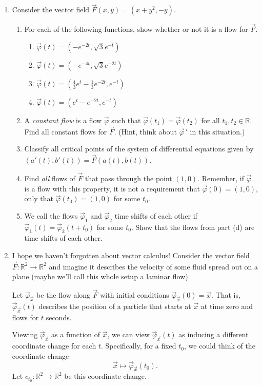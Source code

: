 \documentclass[letter]{article}
\newcommand{\R}{\mathbb{R}}
\begin{document}
\begin{enumerate}
		\item Consider the vector field $\vec F(x,y) = (x+y^2,-y)$.
			\begin{enumerate}
				\item For each of the following functions, show whether or
					not it is a flow for $\vec F$.
					\begin{enumerate}
						\item $\vec \varphi(t) = (-e^{-2t},\sqrt{3}e^{-t})$
						\item $\vec \varphi(t) = (-e^{-4t},\sqrt{3}e^{-2t})$
						\item $\vec \varphi(t) = (\frac{4}{3}e^t-\frac{1}{3}e^{-2t},e^{-t})$
						\item $\vec \varphi(t) = (e^t-e^{-2t},e^{-t})$
					\end{enumerate}
				\item A \emph{constant flow} is a flow $\vec\varphi$ such that $\vec\varphi(t_1)=\vec \varphi(t_2)$ for
					all $t_1,t_2\in \R$.  Find all constant flows for $\vec F$. (Hint, think about $\vec\varphi\,'$ in
					this situation.)
				\item Classify all critical points of the system of differential equations given by
					$(a'(t),b'(t)) = \vec F(a(t),b(t))$.
				\item Find \emph{all} flows of $\vec F$ that pass through the point $(1,0)$.  Remember,
					if $\vec\varphi$ is a flow with this property, it is not a requirement that $\vec\varphi(0)=(1,0)$,
					only that $\vec \varphi(t_0)=(1,0)$ for some $t_0$.
				\item We call the flows $\vec\varphi_1$
					and $\vec \varphi_2$ time shifts of each other if $\vec \varphi_1(t)=\vec \varphi_2(t+t_0)$ for
					some $t_0$. Show that the flows from part (d) are time shifts of each other.  
			\end{enumerate}
		\item {\sc I hope we haven't forgotten about vector calculus}!
			Consider the vector field $\vec F:\R^2\to\R^2$ and imagine it describes the velocity
			of some fluid spread out on a plane (maybe we'll call this whole setup a laminar flow).

			Let $\vec\varphi_{\vec x}$ be the flow along $\vec F$ with initial conditions
			$\vec\varphi_{\vec x}(0)=\vec x$.  That is, $\vec\varphi_{\vec x}(t)$ 
			describes the position of a particle that starts at $\vec x$ at time zero
			and flows for $t$ seconds.

			Viewing $\vec\varphi_{\vec x}$ as a function of $\vec x$, we can view $\vec\varphi_{\vec x}(t)$
			as inducing a different coordinate change for each $t$.  Specifically, for a fixed $t_0$,
			we could think of the coordinate change 
			\[
				\vec x\mapsto \vec \varphi_{\vec x}(t_0).
			\]
			Let $c_{t_0}:\R^2\to\R^2$ be this coordinate change.


\end{enumerate}
\end{document}
